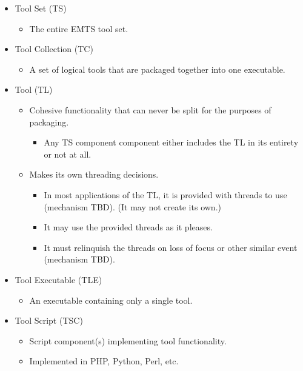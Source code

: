 \begin{itemize}
   \item Tool Set (TS)
      \begin{itemize}
         \item The entire EMTS tool set.
      \end{itemize}
   \item Tool Collection (TC)
      \begin{itemize}
         \item A set of logical tools that are packaged together into one executable.
      \end{itemize}
   \item Tool (TL)
      \begin{itemize}
         \item Cohesive functionality that can never be split for
               the purposes of packaging.
            \begin{itemize}
               \item Any TS component component either includes
                     the TL in its entirety or not at all.
            \end{itemize}
         \item Makes its own threading decisions.
            \begin{itemize}
               \item In most applications of the TL, it is provided with
                     threads to use (mechanism TBD).  (It may not create its own.)
               \item It may use the provided threads as it pleases.
               \item It must relinquish the threads on loss of focus or other
                     similar event (mechanism TBD).
            \end{itemize}
      \end{itemize}
   \item Tool Executable (TLE)
      \begin{itemize}
         \item An executable containing only a single tool.
      \end{itemize}
   \item Tool Script (TSC)
      \begin{itemize}
         \item Script component(s) implementing tool functionality.
         \item Implemented in PHP, Python, Perl, etc.
      \end{itemize}

\end{itemize}
